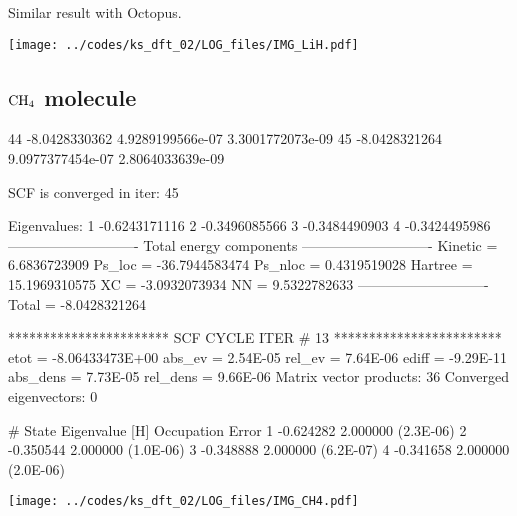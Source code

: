 Similar result with Octopus.

{\centering
\texttt{[image: ../codes/ks\_dft\_02/LOG\_files/IMG\_LiH.pdf]}
}



\subsection{$\ce{CH4}$ molecule}

\begin{textcode}
   44      -8.0428330362   4.9289199566e-07   3.3001772073e-09
   45      -8.0428321264   9.0977377454e-07   2.8064033639e-09

SCF is converged in iter: 45

Eigenvalues:
  1      -0.6243171116
  2      -0.3496085566
  3      -0.3484490903
  4      -0.3424495986
----------------------------
Total energy components
----------------------------
Kinetic =       6.6836723909
Ps_loc  =     -36.7944583474
Ps_nloc =       0.4319519028
Hartree =      15.1969310575
XC      =      -3.0932073934
NN      =       9.5322782633
----------------------------
Total   =      -8.0428321264 
\end{textcode}

\begin{textcode}
 *********************** SCF CYCLE ITER #   13 ************************
 etot  = -8.06433473E+00 abs_ev   =  2.54E-05 rel_ev   =  7.64E-06
 ediff =       -9.29E-11 abs_dens =  7.73E-05 rel_dens =  9.66E-06
Matrix vector products:     36
Converged eigenvectors:      0

#  State  Eigenvalue [H]  Occupation    Error
      1       -0.624282    2.000000   (2.3E-06)
      2       -0.350544    2.000000   (1.0E-06)
      3       -0.348888    2.000000   (6.2E-07)
      4       -0.341658    2.000000   (2.0E-06)   
\end{textcode}

{\centering
\texttt{[image: ../codes/ks\_dft\_02/LOG\_files/IMG\_CH4.pdf]}
}